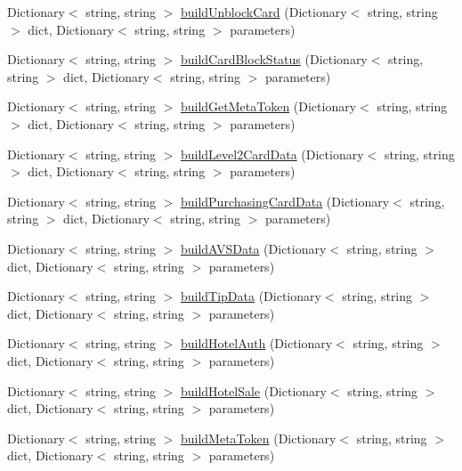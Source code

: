 \begin{DoxyCompactItemize}
\item 
Dictionary$<$ string, string $>$ \mbox{\hyperlink{class_form_sim_1_1_h_t_t_p_handler_ab579245ba4df602a3f5eb56d1107d0a5}{build\+Unblock\+Card}} (Dictionary$<$ string, string $>$ dict, Dictionary$<$ string, string $>$ parameters)
\item 
Dictionary$<$ string, string $>$ \mbox{\hyperlink{class_form_sim_1_1_h_t_t_p_handler_a847479885ccc06cb0925264bab2cb42f}{build\+Card\+Block\+Status}} (Dictionary$<$ string, string $>$ dict, Dictionary$<$ string, string $>$ parameters)
\item 
Dictionary$<$ string, string $>$ \mbox{\hyperlink{class_form_sim_1_1_h_t_t_p_handler_a5786e5a99e06dc5780fcecb076e3e570}{build\+Get\+Meta\+Token}} (Dictionary$<$ string, string $>$ dict, Dictionary$<$ string, string $>$ parameters)
\item 
Dictionary$<$ string, string $>$ \mbox{\hyperlink{class_form_sim_1_1_h_t_t_p_handler_af87ed1f553edd56103a99eb9fca49ce5}{build\+Level2\+Card\+Data}} (Dictionary$<$ string, string $>$ dict, Dictionary$<$ string, string $>$ parameters)
\item 
Dictionary$<$ string, string $>$ \mbox{\hyperlink{class_form_sim_1_1_h_t_t_p_handler_a19a204d9d4e398e1d4b7f96fe3a54d8f}{build\+Purchasing\+Card\+Data}} (Dictionary$<$ string, string $>$ dict, Dictionary$<$ string, string $>$ parameters)
\item 
Dictionary$<$ string, string $>$ \mbox{\hyperlink{class_form_sim_1_1_h_t_t_p_handler_ae36d78f08bb69c27da7e0c5d73b60db7}{build\+A\+V\+S\+Data}} (Dictionary$<$ string, string $>$ dict, Dictionary$<$ string, string $>$ parameters)
\item 
Dictionary$<$ string, string $>$ \mbox{\hyperlink{class_form_sim_1_1_h_t_t_p_handler_a16362967f4b50ff4a0b9a686cc7efd1a}{build\+Tip\+Data}} (Dictionary$<$ string, string $>$ dict, Dictionary$<$ string, string $>$ parameters)
\item 
Dictionary$<$ string, string $>$ \mbox{\hyperlink{class_form_sim_1_1_h_t_t_p_handler_a0e271753990736b71c2194688e1f55f8}{build\+Hotel\+Auth}} (Dictionary$<$ string, string $>$ dict, Dictionary$<$ string, string $>$ parameters)
\item 
Dictionary$<$ string, string $>$ \mbox{\hyperlink{class_form_sim_1_1_h_t_t_p_handler_a892cab2e68d920253f7efb8a9857bee4}{build\+Hotel\+Sale}} (Dictionary$<$ string, string $>$ dict, Dictionary$<$ string, string $>$ parameters)
\item 
Dictionary$<$ string, string $>$ \mbox{\hyperlink{class_form_sim_1_1_h_t_t_p_handler_a709759915daafeaf76b70ed470f07b33}{build\+Meta\+Token}} (Dictionary$<$ string, string $>$ dict, Dictionary$<$ string, string $>$ parameters)

\end{DoxyCompactItemize}
